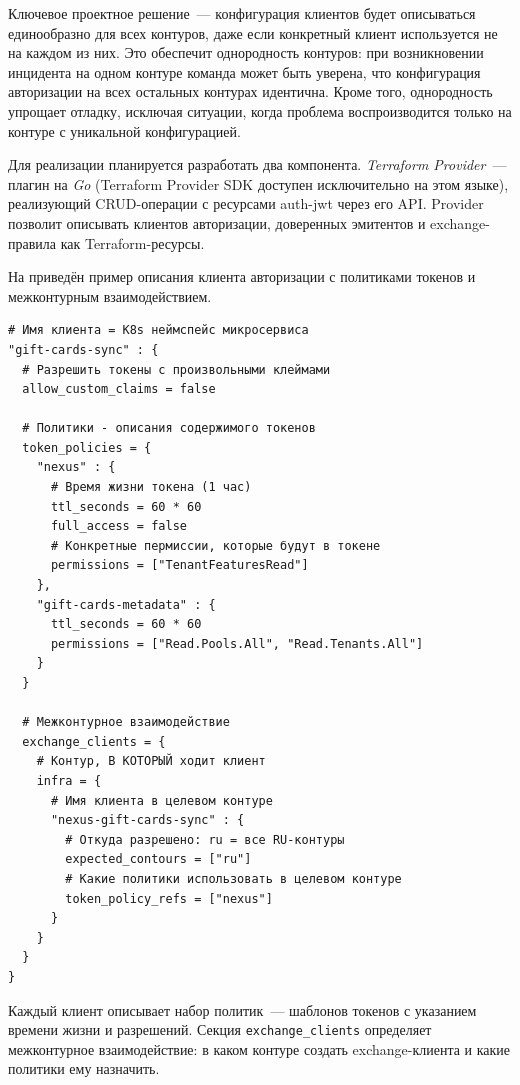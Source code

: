 Ключевое проектное решение~--- конфигурация клиентов
будет описываться единообразно для всех контуров,
даже если конкретный клиент используется не на каждом из них.
Это обеспечит однородность контуров:
при возникновении инцидента на одном контуре
команда может быть уверена, что конфигурация авторизации
на всех остальных контурах идентична.
Кроме того, однородность упрощает отладку,
исключая ситуации, когда проблема воспроизводится только
на контуре с уникальной конфигурацией.

Для реализации планируется разработать два компонента.
\emph{Terraform Provider}~--- плагин на \emph{Go}
(Terraform Provider SDK доступен исключительно на этом языке),
реализующий CRUD-операции с ресурсами auth-jwt через его API.
Provider позволит описывать клиентов авторизации,
доверенных эмитентов и exchange-правила
как Terraform-ресурсы.

На  приведён пример описания клиента авторизации
с политиками токенов и межконтурным взаимодействием.

\begin{lstlisting}[language=HCL]
# Имя клиента = K8s неймспейс микросервиса
"gift-cards-sync" : {
  # Разрешить токены с произвольными клеймами
  allow_custom_claims = false

  # Политики - описания содержимого токенов
  token_policies = {
    "nexus" : {
      # Время жизни токена (1 час)
      ttl_seconds = 60 * 60
      full_access = false
      # Конкретные пермиссии, которые будут в токене
      permissions = ["TenantFeaturesRead"]
    },
    "gift-cards-metadata" : {
      ttl_seconds = 60 * 60
      permissions = ["Read.Pools.All", "Read.Tenants.All"]
    }
  }

  # Межконтурное взаимодействие
  exchange_clients = {
    # Контур, В КОТОРЫЙ ходит клиент
    infra = {
      # Имя клиента в целевом контуре
      "nexus-gift-cards-sync" : {
        # Откуда разрешено: ru = все RU-контуры
        expected_contours = ["ru"]
        # Какие политики использовать в целевом контуре
        token_policy_refs = ["nexus"]
      }
    }
  }
}
\end{lstlisting}

Каждый клиент описывает набор политик~--- шаблонов токенов
с указанием времени жизни и разрешений.
Секция \texttt{exchange\_clients} определяет межконтурное взаимодействие:
в каком контуре создать exchange-клиента и какие политики ему назначить.

